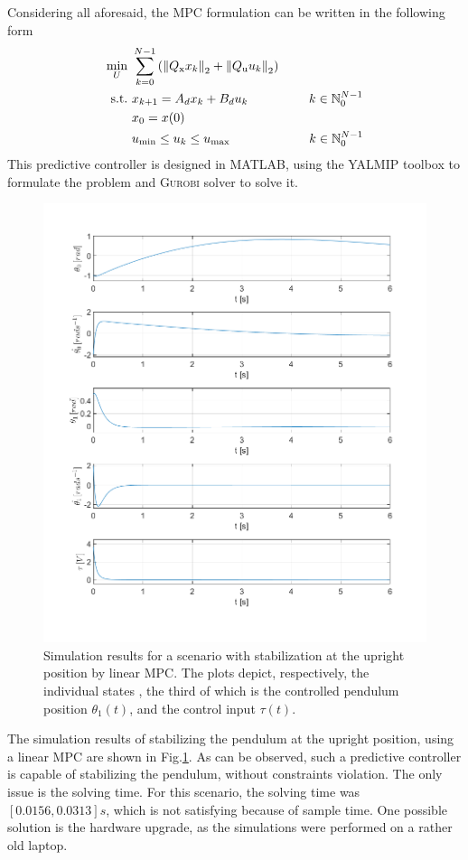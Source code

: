Considering all aforesaid, the MPC formulation can be written in the following form
\begin{subequations}\label{mpc:linear}
	\begin{align}
	\min_{U}\ &\sum_{k=0}^{N-1} \left( \left\| Q _{\text{x}}x_{k}\right\|_2+\left\|Q _{\text{u}}u_{k}\right\|_2 \right)\\
	\text{s.t.}\ &x_{k+1} = A_dx_{k} + B_du_{k}\qquad\qquad\ \ \,  k \in \mathbb{N}_0^{N-1}\\
	&x_0 = x(0)\\
	&u _{\text{min}}\leq u_{k}\leq u _{\text{max}}\qquad\qquad\qquad\;   k \in \mathbb{N}_0^{N-1}
	\end{align}
\end{subequations}
This predictive controller is designed in \textsc{MATLAB}, using the \textsc{YALMIP} toolbox \cite{YALMIP} to formulate the problem and \textsc{Gurobi} solver to solve it.
\newpage
\begin{figure}[H]
	\centering
	\includegraphics[width=1.1\linewidth]{images/MPC}
	\caption{Simulation results for a scenario with stabilization at the upright position by linear MPC. The plots depict, respectively, the individual states , the third of which is the controlled pendulum position $\theta_1(t)$, and the control input $\tau(t)$.}
	\label{mpc}
\end{figure}
The simulation results of stabilizing the pendulum at the upright position, using a linear MPC are shown in Fig.\ref{mpc}. As can be observed, such a predictive controller is capable of stabilizing the pendulum, without constraints violation. The only issue is the solving time. For this scenario, the solving time was $[0.0156, 0.0313]s$, which is not satisfying because of sample time. One possible solution is the hardware upgrade, as the simulations were performed on a rather old laptop.

